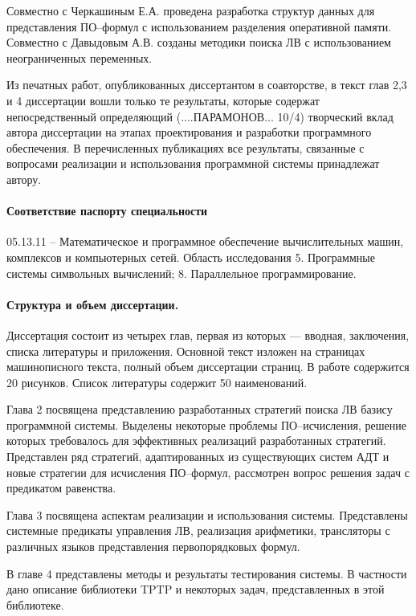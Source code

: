 Совместно с Черкашиным Е.А. проведена разработка структур данных для представления ПО--формул с использованием разделения оперативной памяти. Совместно с Давыдовым А.В. созданы методики поиска ЛВ с использованием неограниченных переменных.

Из печатных работ, опубликованных диссертантом в соавторстве, в текст глав 2,3 и 4 диссертации вошли только те результаты, которые содержат непосредственный определяющий (....ПАРАМОНОВ... 10/4) творческий вклад автора диссертации на этапах проектирования и разработки программного обеспечения. В перечисленных публикациях все результаты, связанные с вопросами реализации и использования программной системы принадлежат автору.

\paragraph{Соответствие паспорту специальности}
05.13.11 -- Математическое и программное обеспечение вычислительных машин, комплексов и компьютерных сетей. Область исследования 5. Программные системы символьных вычислений; 8. Параллельное программирование.

\paragraph{Структура и объем диссертации.} Диссертация состоит из четырех глав, первая из которых --- вводная, заключения, списка литературы и приложения. Основной текст изложен на \pageref{pg:main} страницах машинописного текста, полный объем диссертации \pageref{pg:total} страниц. В работе содержится 20 рисунков. Список литературы содержит 50 наименований.

Глава 2 посвящена представлению разработанных стратегий поиска ЛВ базису программной системы. Выделены некоторые проблемы ПО--исчисления, решение которых требовалось для эффективных реализаций разработанных стратегий. Представлен ряд стратегий, адаптированных из существующих систем АДТ и новые стратегии для исчисления ПО--формул, рассмотрен вопрос решения задач с предикатом равенства.

Глава 3 посвящена аспектам реализации и использования системы. Представлены системные предикаты управления ЛВ, реализация арифметики, трансляторы с различных языков представления первопорядковых формул.

В главе 4 представлены методы и результаты тестирования системы. В частности дано описание библиотеки TPTP и некоторых задач, представленных в этой библиотеке. %

